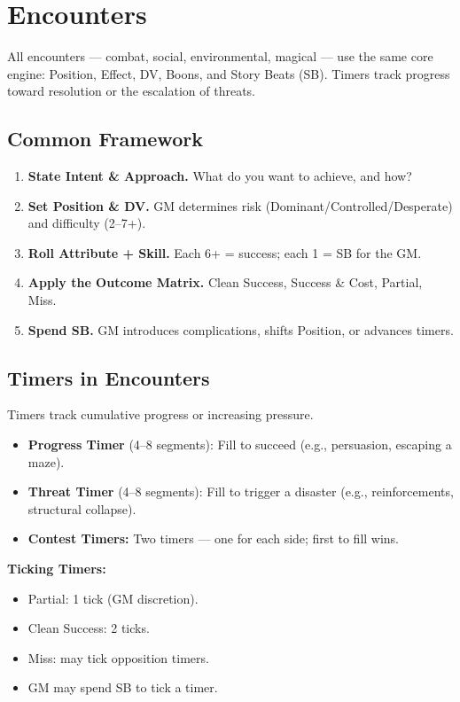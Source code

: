 
\section{Encounters}

All encounters --- combat, social, environmental, magical --- use the same core engine: Position, Effect, DV, Boons, and Story Beats (SB). Timers track progress toward resolution or the escalation of threats.

\subsection{Common Framework}

\begin{enumerate}
  \item \textbf{State Intent \& Approach.} What do you want to achieve, and how?
  \item \textbf{Set Position \& DV.} GM determines risk (Dominant/Controlled/Desperate) and difficulty (2--7+).
  \item \textbf{Roll Attribute + Skill.} Each 6+ = success; each 1 = SB for the GM.
  \item \textbf{Apply the Outcome Matrix.} Clean Success, Success \& Cost, Partial, Miss.
  \item \textbf{Spend SB.} GM introduces complications, shifts Position, or advances timers.
\end{enumerate}

\subsection{Timers in Encounters}

Timers track cumulative progress or increasing pressure.

\begin{itemize}
  \item \textbf{Progress Timer } (4--8 segments): Fill to succeed (e.g., persuasion, escaping a maze).
  \item \textbf{Threat Timer } (4--8 segments): Fill to trigger a disaster (e.g., reinforcements, structural collapse).
  \item \textbf{Contest Timers:} Two timers --- one for each side; first to fill wins.
\end{itemize}

\textbf{Ticking Timers:}
\begin{itemize}
  \item Partial: 1 tick (GM discretion).
  \item Clean Success: 2 ticks.
  \item Miss: may tick opposition timers.
  \item GM may spend SB to tick a timer.
\end{itemize}

